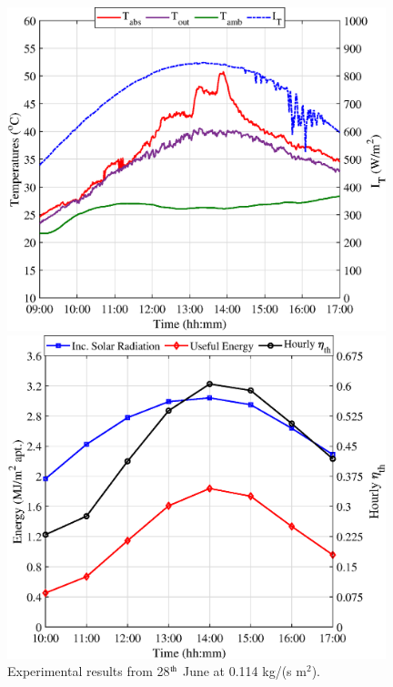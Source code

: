 \begin{figure}[!ht]
	\centering
	\begin{minipage}{0.49\textwidth}
		\centering
		\includegraphics[width=0.98\textwidth]{figs/0115-1.eps} %
	\end{minipage}\hfill
	\begin{minipage}{0.49\textwidth}
		\centering
		\includegraphics[width=0.98\textwidth]{figs/0115-2.eps} %
	\end{minipage}
	
	\caption{Experimental results from 28$^{\rm{th}}$ June at 0.114 kg/(s m$^2$).}
	\label{0115}
\end{figure}

